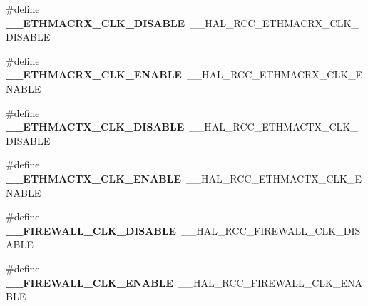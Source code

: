 \begin{DoxyCompactItemize}
\item 
\#define {\bfseries \+\_\+\+\_\+\+E\+T\+H\+M\+A\+C\+R\+X\+\_\+\+C\+L\+K\+\_\+\+D\+I\+S\+A\+B\+LE}~\+\_\+\+\_\+\+H\+A\+L\+\_\+\+R\+C\+C\+\_\+\+E\+T\+H\+M\+A\+C\+R\+X\+\_\+\+C\+L\+K\+\_\+\+D\+I\+S\+A\+B\+LE\hypertarget{group___h_a_l___r_c_c___aliased_ga2fdcbe11c1caa9f4868d73b309c13b56}{}\label{group___h_a_l___r_c_c___aliased_ga2fdcbe11c1caa9f4868d73b309c13b56}

\item 
\#define {\bfseries \+\_\+\+\_\+\+E\+T\+H\+M\+A\+C\+R\+X\+\_\+\+C\+L\+K\+\_\+\+E\+N\+A\+B\+LE}~\+\_\+\+\_\+\+H\+A\+L\+\_\+\+R\+C\+C\+\_\+\+E\+T\+H\+M\+A\+C\+R\+X\+\_\+\+C\+L\+K\+\_\+\+E\+N\+A\+B\+LE\hypertarget{group___h_a_l___r_c_c___aliased_ga3568b7579d0d56fe1184a8bd8ba6dcc4}{}\label{group___h_a_l___r_c_c___aliased_ga3568b7579d0d56fe1184a8bd8ba6dcc4}

\item 
\#define {\bfseries \+\_\+\+\_\+\+E\+T\+H\+M\+A\+C\+T\+X\+\_\+\+C\+L\+K\+\_\+\+D\+I\+S\+A\+B\+LE}~\+\_\+\+\_\+\+H\+A\+L\+\_\+\+R\+C\+C\+\_\+\+E\+T\+H\+M\+A\+C\+T\+X\+\_\+\+C\+L\+K\+\_\+\+D\+I\+S\+A\+B\+LE\hypertarget{group___h_a_l___r_c_c___aliased_gaf41b29b7783e35afef15675e4a8fb4a6}{}\label{group___h_a_l___r_c_c___aliased_gaf41b29b7783e35afef15675e4a8fb4a6}

\item 
\#define {\bfseries \+\_\+\+\_\+\+E\+T\+H\+M\+A\+C\+T\+X\+\_\+\+C\+L\+K\+\_\+\+E\+N\+A\+B\+LE}~\+\_\+\+\_\+\+H\+A\+L\+\_\+\+R\+C\+C\+\_\+\+E\+T\+H\+M\+A\+C\+T\+X\+\_\+\+C\+L\+K\+\_\+\+E\+N\+A\+B\+LE\hypertarget{group___h_a_l___r_c_c___aliased_gacbad4e4827b2926b00956035dc5500ee}{}\label{group___h_a_l___r_c_c___aliased_gacbad4e4827b2926b00956035dc5500ee}

\item 
\#define {\bfseries \+\_\+\+\_\+\+F\+I\+R\+E\+W\+A\+L\+L\+\_\+\+C\+L\+K\+\_\+\+D\+I\+S\+A\+B\+LE}~\+\_\+\+\_\+\+H\+A\+L\+\_\+\+R\+C\+C\+\_\+\+F\+I\+R\+E\+W\+A\+L\+L\+\_\+\+C\+L\+K\+\_\+\+D\+I\+S\+A\+B\+LE\hypertarget{group___h_a_l___r_c_c___aliased_ga65f5c6169ae96aa7bfda9f5ec6003aa0}{}\label{group___h_a_l___r_c_c___aliased_ga65f5c6169ae96aa7bfda9f5ec6003aa0}

\item 
\#define {\bfseries \+\_\+\+\_\+\+F\+I\+R\+E\+W\+A\+L\+L\+\_\+\+C\+L\+K\+\_\+\+E\+N\+A\+B\+LE}~\+\_\+\+\_\+\+H\+A\+L\+\_\+\+R\+C\+C\+\_\+\+F\+I\+R\+E\+W\+A\+L\+L\+\_\+\+C\+L\+K\+\_\+\+E\+N\+A\+B\+LE\hypertarget{group___h_a_l___r_c_c___aliased_ga4bc6556711651ce1fd0fa2ba6de66688}{}\label{group___h_a_l___r_c_c___aliased_ga4bc6556711651ce1fd0fa2ba6de66688}


\end{DoxyCompactItemize}
